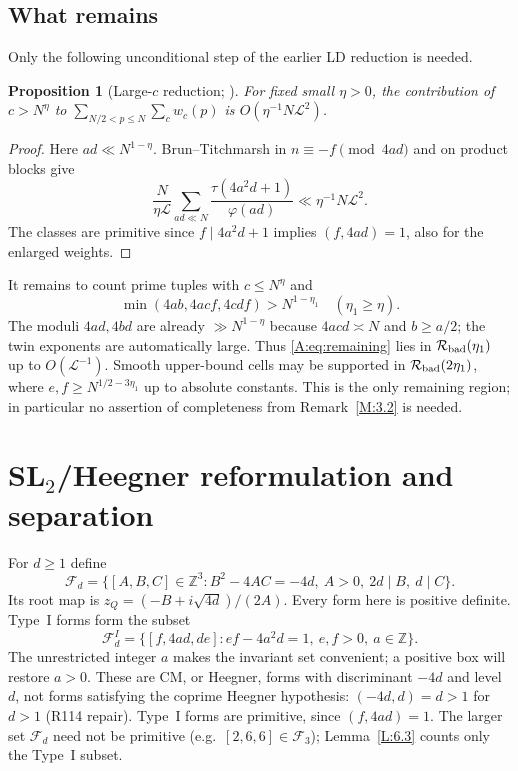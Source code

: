 \documentclass[10pt,reqno]{amsart}
\newtheorem{proposition}[theorem]{Proposition}
\theoremstyle{definition}
\numberwithin{equation}{section}
\newcommand{\Z}{\mathbb Z}
\newcommand{\cL}{\mathcal L}
\newcommand{\cF}{\mathcal F}
\begin{document}
\subsection{What remains}
Only the following unconditional step of the earlier LD reduction is needed.
\begin{proposition}[Large-$c$ reduction; {\cite[proof of Theorem~3.8, step~(1)]{MN3}}]\label{M:3.8}
For fixed small $\eta>0$, the contribution of $c>N^\eta$ to
$\sum_{N/2<p\le N}\sum_c w_c(p)$ is $O(\eta^{-1}N\cL^2)$.
\end{proposition}
\begin{proof}
Here $ad\ll N^{1-\eta}$. Brun--Titchmarsh in
$n\equiv-f\pmod{4ad}$ and \cite[(8.1)--(8.2)]{ET} on product blocks give
\[
 \frac{N}{\eta\cL}\sum_{ad\ll N}\frac{\tau(4a^2d+1)}{\varphi(ad)}
       \ll\eta^{-1}N\cL^2.
\]
The classes are primitive since $f\mid4a^2d+1$ implies $(f,4ad)=1$,
also for the enlarged weights.
\end{proof}

It remains to count prime tuples with $c\le N^\eta$ and
\begin{equation}\label{A:eq:remaining}
 \min(4ab,4acf,4cdf)>N^{1-\eta_1}\quad(\eta_1\ge\eta).
\end{equation}
The moduli $4ad,4bd$ are already $\gg N^{1-\eta}$ because
$4acd\asymp N$ and $b\ge a/2$; the twin exponents are automatically large.
Thus \eqref{A:eq:remaining} lies in $\mathcal R_{\rm bad}(\eta_1)$ up to
$O(\cL^{-1})$. Smooth upper-bound cells may be supported in
$\mathcal R_{\rm bad}(2\eta_1)$, where
$e,f\ge N^{1/2-3\eta_1}$ up to absolute constants. This is the only
remaining region; in particular no assertion of completeness from
Remark~\ref{M:3.2} is needed.

\section{\texorpdfstring{SL$_2$}{SL2}/Heegner reformulation and separation}\label{sec:heegner}
For $d\ge1$ define
\[
 \cF_d=\{[A,B,C]\in\Z^3:B^2-4AC=-4d,\ A>0,
                         \ 2d\mid B,\ d\mid C\}.
\]
Its root map is $z_Q=(-B+i\sqrt{4d})/(2A)$.
Every form here is positive definite. Type~I forms form the subset
\[
 \cF_d^I=\{[f,4ad,de]:ef-4a^2d=1,\ e,f>0,\ a\in\Z\}.
\]
The unrestricted integer $a$ makes the invariant set convenient; a positive
box will restore $a>0$. These are CM, or Heegner, forms with discriminant
$-4d$ and level $d$, not forms satisfying the coprime Heegner hypothesis:
$(-4d,d)=d>1$ for $d>1$ (R114 repair). Type~I forms are primitive, since $(f,4ad)=1$.
The larger set $\cF_d$ need not be primitive (e.g.\ $[2,6,6]\in\cF_3$);
Lemma~\ref{L:6.3} counts only the Type~I subset.
\end{document}

